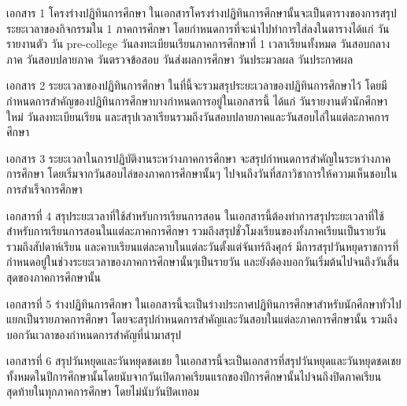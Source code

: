 \par เอกสาร	1 โครงร่างปฏิทินการศึกษา ในเอกสารโครงร่างปฏิทินการศึกษานั้นจะเป็นตารางของการสรุประยะเวลาของกิจกรรมใน 1 ภาคการศึกษา
โดยกำหนดการที่จะนำไปทำการใส่ลงในตารางได้แก่ วันรายงานตัว วัน pre-college วันลงทะเบียนเรียนภาคการศึกษาที่ 1 เวลาเรียนทั้งหมด วันสอบกลางภาค วันสอบปลายภาค วันตรวจข้อสอบ วันส่งผลการศึกษา วันประมวลผล วันประกาศผล \enskip
\par เอกสาร 2 ระยะเวลาของปฏิทินการศึกษา
ในที่นี้จะรวมสรุประยะเวลาของปฏิทินการศึกษาไว้ โดยมีกำหนดการสำคัญของปฏิทินการศึกษาบางกำหนดการอยู่ในเอกสารนี้ ได้แก่ วันรายงานตัวนักศึกษาใหม่ วันลงทะเบียนเรียน และสรุปเวลาเรียนรวมถึงวันสอบปลายภาคและวันสอบไล่ในแต่ละภาคการศึกษา \enskip
\par เอกสาร 3 ระยะเวลาในการปฏิบัติงานระหว่างภาคการศึกษา
จะสรุปกำหนดการสำคัญในระหว่างภาคการศึกษา โดยเริ่มจากวันสอบไล่ของภาคการศึกษานั้นๆ ไปจนถึงวันที่สภาวิชาการให้ความเห็นชอบในการสำเร็จการศึกษา \enskip
\par เอกสารที่ 4 สรุประยะเวลาที่ใช้สำหรับการเรียนการสอน
ในเอกสารนี้ต้องทำการสรุประยะเวลาที่ใช้สำหรับการเรียนการสอนในแต่ละภาคการศึกษา รวมถึงสรุปชั่วโมงเรียนของทั้งภาคเรียนเป็นรายวัน รวมถึงสัปดาห์เรียน และคาบเรียนแต่ละคาบในแต่ละวันตั้งแต่จันทร์ถึงศุกร์ มีการสรุปวันหยุดราชการที่กำหนดอยู่ในช่วงระยะเวลาของภาคการศึกษานั้นๆเป็นรายวัน และยังต้องบอกวันเริ่มต้นไปจนถึงวันสิ้นสุดของภาคการศึกษานั้น \enskip
\par เอกสารที่ 5 ร่างปฏิทินการศึกษา
ในเอกสารนี้จะเป็นร่างประกาศปฏิทินการศึกษาสำหรับนักศึกษาทั่วไปแยกเป็นรายภาคการศึกษา โดยจะสรุปกำหนดการสำคัญและวันสอบในแต่ละภาคการศึกษานั้น รวมถึงบอกวันเวลาของกำหนดการสำคัญที่นำมาสรุป
\par เอกสารที่ 6 สรุปวันหยุดและวันหยุดชดเชย
ในเอกสารนี้จะเป็นเอกสารที่สรุปวันหยุดและวันหยุดชดเชยทั้งหมดในปีการศึกษานั้นโดยนับจากวันเปิดภาคเรียนแรกของปีการศึกษานั้นไปจนถึงปิดภาคเรียนสุดท้ายในทุกภาคการศึกษา โดยไม่นับวันปิดเทอม


